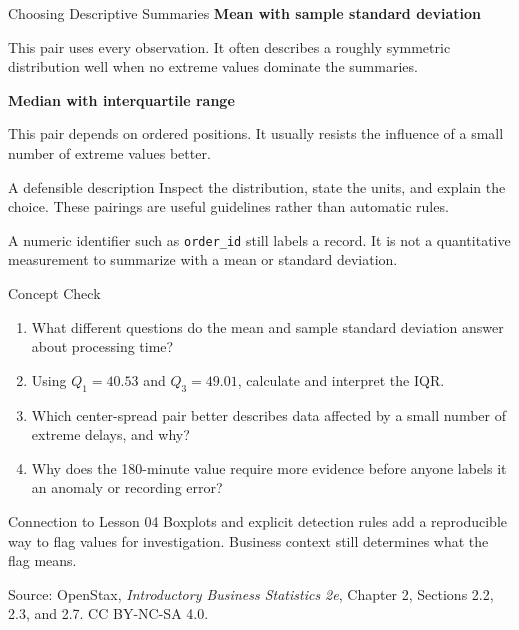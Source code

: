 \documentclass[aspectratio=169,10pt,english]{beamer}
\begin{document}
\begin{frame}{Choosing Descriptive Summaries}
  \small
  \textbf{Mean with sample standard deviation}\par\vspace{0.2em}
  This pair uses every observation. It often describes a roughly symmetric
  distribution well when no extreme values dominate the summaries.

  \vspace{0.7em}
  \textbf{Median with interquartile range}\par\vspace{0.2em}
  This pair depends on ordered positions. It usually resists the influence of a
  small number of extreme values better.

  \vspace{0.8em}
  \begin{alertblock}{A defensible description}
    Inspect the distribution, state the units, and explain the choice. These
    pairings are useful guidelines rather than automatic rules.
  \end{alertblock}

  A numeric identifier such as \texttt{order\_id} still labels a record. It is
  not a quantitative measurement to summarize with a mean or standard deviation.
\end{frame}

\begin{frame}{Concept Check}
  \begin{enumerate}
    \item What different questions do the mean and sample standard deviation
      answer about processing time?
    \item Using $Q_1=40.53$ and $Q_3=49.01$, calculate and interpret the IQR.
    \item Which center-spread pair better describes data affected by a small
      number of extreme delays, and why?
    \item Why does the 180-minute value require more evidence before anyone
      labels it an anomaly or recording error?
  \end{enumerate}

  \vspace{0.5em}
  \begin{block}{Connection to Lesson 04}
    Boxplots and explicit detection rules add a reproducible way to flag values
    for investigation. Business context still determines what the flag means.
  \end{block}

  \vfill
  \scriptsize Source: OpenStax, \textit{Introductory Business Statistics 2e},
  Chapter 2, Sections 2.2, 2.3, and 2.7. CC BY-NC-SA 4.0.
\end{frame}

\appendix
\end{document}
